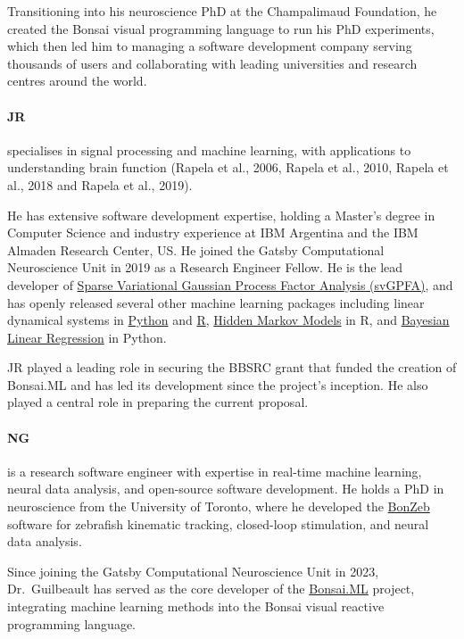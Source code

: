 Transitioning into his neuroscience PhD at the Champalimaud Foundation, he
created the Bonsai visual programming language to run his PhD experiments,
which then led him to managing a software development company serving thousands
of users and collaborating with leading universities and research centres
around the world.

\paragraph{JR} specialises in
signal processing and machine learning, with applications to understanding
brain function (Rapela et al., 2006, Rapela et al., 2010, Rapela et al., 2018
and Rapela et al., 2019).

He has extensive software development expertise, holding a Master’s degree in
Computer Science and industry experience at IBM Argentina and the IBM Almaden
Research Center, US.
%
He joined the Gatsby Computational Neuroscience Unit in 2019 as a Research
Engineer Fellow.
%
He is the lead developer of \href{https://github.com/joacorapela/svGPFA}{Sparse
Variational Gaussian Process Factor Analysis (svGPFA)}, and has openly released
several other machine learning packages including linear dynamical systems in
\href{https://github.com/joacorapela/ssm}{Python} and
\href{https://github.com/joacorapela/kalmanFilter}{R},
\href{https://github.com/joacorapela/hiddenMarkovModels}{Hidden Markov Models}
in R, and
\href{https://github.com/joacorapela/bayesianLinearRegression}{Bayesian Linear
Regression} in Python.

JR played a leading role in securing the BBSRC grant that funded the
creation of Bonsai.ML and has led its development since the project’s
inception. He also played a central role in preparing the current proposal.

\paragraph{NG} is a research software engineer with expertise in real-time
machine learning, neural data analysis, and open-source software development.
He holds a PhD in neuroscience from the University of Toronto, where he
developed the \href{https://ncguilbeault.github.io/BonZeb/}{BonZeb} software
for zebrafish kinematic tracking, closed-loop stimulation, and neural data
analysis.

Since joining the Gatsby Computational Neuroscience Unit in 2023,
Dr.~Guilbeault has served as the core developer of the
\href{https://bonsai-rx.org/machinelearning}{Bonsai.ML} project, integrating
machine learning methods into the Bonsai visual reactive programming language.

